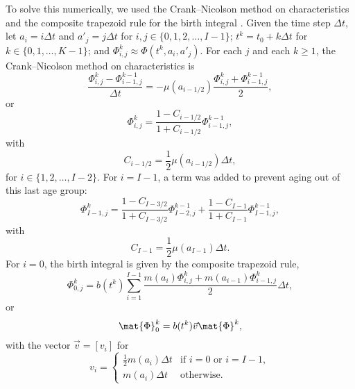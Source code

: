 \documentclass{jpmarticle}
\begin{document}
To solve this numerically, we used the Crank--Nicolson method on
characteristics and the composite trapezoid rule for the birth
integral \autocite{milner_1992}.  Given the time step $\Delta t$,
let $a_i = i \Delta t$
and $a'_j = j \Delta t$
for $i, j \in \{0, 1, 2, \ldots, I - 1\}$;
$t^k = t_0 + k \Delta t$
for $k \in \{0, 1, \ldots, K - 1\}$;
and $\Phi_{i, j}^k \approx \Phi(t^k, a_i, a'_j)$.
For each $j$
and each $k \geq 1$, the Crank--Nicolson method on characteristics is
\begin{equation}
  \label{CN_step}
  \frac{\Phi_{i, j}^k - \Phi_{i - 1, j}^{k - 1}}{\Delta t}
  = - \mu(a_{i - 1 / 2})
  \frac{\Phi_{i, j}^k + \Phi_{i - 1, j}^{k - 1}}{2},
\end{equation}
or
\begin{equation}
  \Phi_{i, j}^k
  = \frac{1 - C_{i - 1 / 2}}{1 + C_{i - 1 / 2}}
  \Phi_{i - 1, j}^{k - 1},
\end{equation}
with
\begin{equation}
  C_{i - 1 / 2}
  = \frac{1}{2} \mu(a_{i - 1 / 2}) \Delta t,
\end{equation}
for $i \in \{1, 2, \ldots, I - 2\}$.  For $i = I - 1$,
a term was added to prevent aging out of this
last age group:
\begin{equation}
  \Phi_{I - 1, j}^k
  = \frac{1 - C_{I - 3 / 2}}{1 + C_{I - 3 / 2}}
  \Phi_{I - 2, j}^{k - 1}
  + \frac{1 - C_{I - 1}}{1 + C_{I - 1}}
  \Phi_{I - 1, j}^{k - 1},
\end{equation}
with
\begin{equation}
  C_{I - 1}
  = \frac{1}{2} \mu(a_{I - 1}) \Delta t.
\end{equation}
For $i = 0$, the birth integral is given by the composite trapezoid rule,
\begin{equation}
  \label{birth_step}
  \Phi_{0, j}^k =
  b(t^k)
  \sum_{i = 1}^{I - 1}
  \frac{m(a_i) \Phi_{i, j}^k
    + m(a_{i - 1}) \Phi_{i - 1, j}^k}{2}
  \Delta t,
\end{equation}
or
\begin{equation}
  \mat{\Phi}_0^k = b(t^k) \vec{v} \mat{\Phi}^k,
\end{equation}
with the vector $\vec{v} = [v_i]$ for
\begin{equation}
  v_i =
  \begin{cases}
    \frac{1}{2} m(a_i) \Delta t
    & \text{if $i = 0$ or $i = I - 1$}, \\
    m(a_i) \Delta t
    & \text{otherwise}.
  \end{cases}
\end{equation}
\end{document}
